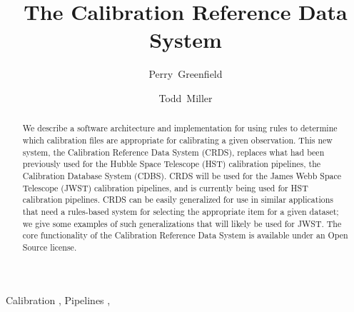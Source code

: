 \documentclass[final,authoryear,5p,times,twocolumn]{elsarticle}
\begin{document}
\begin{frontmatter}



\title{The Calibration Reference Data System}



\author[stsci]{Perry~Greenfield}
\author[stsci]{Todd~Miller}

\address[stsci]{Space Telescope Science Institute, 3700 San Martin Drive, Baltimore, MD 21218, USA}

\begin{abstract}

We describe a software architecture and implementation for using rules to
determine which calibration files are appropriate for calibrating a
given observation. This new system, the Calibration Reference Data System
(CRDS), replaces what had been previously used for
the Hubble Space Telescope (HST) calibration pipelines, 
the Calibration Database System (CDBS). 
CRDS will be used for the James Webb Space
Telescope (JWST) calibration pipelines, and is currently
being used for HST calibration pipelines. CRDS can be
easily generalized for use in similar applications that need a rules-based
system for selecting the appropriate item for a given dataset; we give some
examples of such generalizations that will likely be used for JWST. The core
functionality of the Calibration Reference Data System is available under an
Open Source license.
\end{abstract}

\begin{keyword}


Calibration \sep
Pipelines \sep

\end{keyword}

\end{frontmatter}
\end{document}
